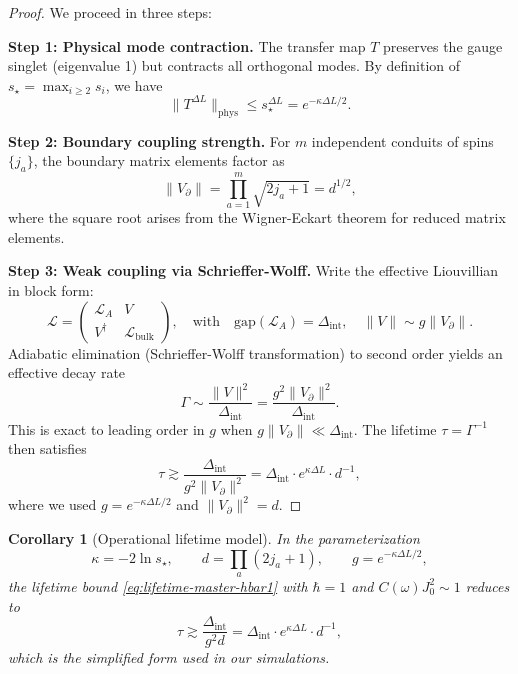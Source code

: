 \documentclass[11pt]{article}
\theoremstyle{plain}
\newtheorem{corollary}[theorem]{Corollary}
\theoremstyle{definition}
\begin{document}
\begin{proof}
  We proceed in three steps:

  \textbf{Step 1: Physical mode contraction.}
  The transfer map $T$ preserves the gauge singlet (eigenvalue 1) but contracts all orthogonal modes. By definition of $s_\star = \max_{i \geq 2} s_i$, we have
  \[
    \|T^{\Delta L}\|_{\mathrm{phys}} \leq s_\star^{\Delta L} = e^{-\kappa \Delta L/2}.
  \]

  \textbf{Step 2: Boundary coupling strength.}
  For $m$ independent conduits of spins $\{j_a\}$, the boundary matrix elements factor as
  \[
    \|V_\partial\| = \prod_{a=1}^m \sqrt{2j_a+1} = d^{1/2},
  \]
  where the square root arises from the Wigner-Eckart theorem for reduced matrix elements.

  \textbf{Step 3: Weak coupling via Schrieffer-Wolff.}
  Write the effective Liouvillian in block form:
  \[
    \mathcal{L} =
    \begin{pmatrix} \mathcal{L}_A & V \\ V^\dagger & \mathcal{L}_{\text{bulk}}
    \end{pmatrix},
    \quad \text{with} \quad \text{gap}(\mathcal{L}_A) = \Delta_{\mathrm{int}}, \quad \|V\| \sim g\|V_\partial\|.
  \]
  Adiabatic elimination (Schrieffer-Wolff transformation) to second order yields an effective decay rate
  \[
    \Gamma \sim \frac{\|V\|^2}{\Delta_{\mathrm{int}}} = \frac{g^2 \|V_\partial\|^2}{\Delta_{\mathrm{int}}}.
  \]
  This is exact to leading order in $g$ when $g\|V_\partial\| \ll \Delta_{\mathrm{int}}$. The lifetime $\tau = \Gamma^{-1}$ then satisfies
  \[
    \tau \gtrsim \frac{\Delta_{\mathrm{int}}}{g^2 \|V_\partial\|^2} = \Delta_{\mathrm{int}} \cdot e^{\kappa \Delta L} \cdot d^{-1},
  \]
  where we used $g = e^{-\kappa \Delta L/2}$ and $\|V_\partial\|^2 = d$.
\end{proof}

\begin{corollary}[Operational lifetime model]\label{cor:operational-lifetime}
  In the parameterization
  \[
    \kappa = -2\ln s_\star,\qquad d=\prod_a (2j_a+1),\qquad g=e^{-\kappa \Delta L/2},
  \]
  the lifetime bound \eqref{eq:lifetime-master-hbar1} with $\hbar=1$ and $C(\omega)J_0^2 \sim 1$ reduces to
  \[
    \tau \gtrsim \frac{\Delta_{\mathrm{int}}}{g^2 d} = \Delta_{\mathrm{int}} \cdot e^{\kappa \Delta L} \cdot d^{-1},
  \]
  which is the simplified form used in our simulations.
\end{corollary}
\end{document}

